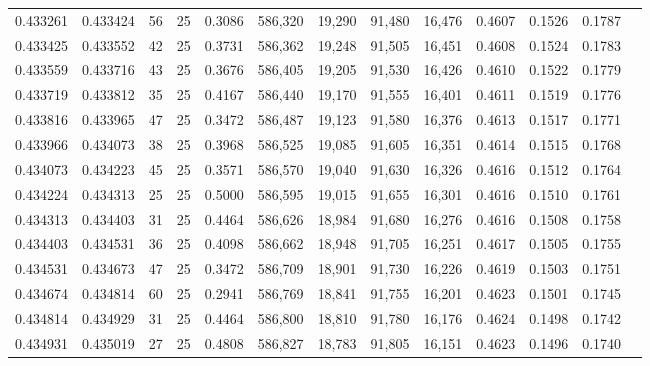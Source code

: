 \begin{tabular}{rrrrrrrrrrrrr}
0.433261 & 0.433424 &    56 &  25 &                                     0.3086 & 586,320 &  19,290 &  91,480 &  16,476 & 0.4607 & 0.1526 & 0.1787 \\
0.433425 & 0.433552 &    42 &  25 &                                     0.3731 & 586,362 &  19,248 &  91,505 &  16,451 & 0.4608 & 0.1524 & 0.1783 \\
0.433559 & 0.433716 &    43 &  25 &                                     0.3676 & 586,405 &  19,205 &  91,530 &  16,426 & 0.4610 & 0.1522 & 0.1779 \\
0.433719 & 0.433812 &    35 &  25 &                                     0.4167 & 586,440 &  19,170 &  91,555 &  16,401 & 0.4611 & 0.1519 & 0.1776 \\
0.433816 & 0.433965 &    47 &  25 &                                     0.3472 & 586,487 &  19,123 &  91,580 &  16,376 & 0.4613 & 0.1517 & 0.1771 \\
0.433966 & 0.434073 &    38 &  25 &                                     0.3968 & 586,525 &  19,085 &  91,605 &  16,351 & 0.4614 & 0.1515 & 0.1768 \\
0.434073 & 0.434223 &    45 &  25 &                                     0.3571 & 586,570 &  19,040 &  91,630 &  16,326 & 0.4616 & 0.1512 & 0.1764 \\
0.434224 & 0.434313 &    25 &  25 &                                     0.5000 & 586,595 &  19,015 &  91,655 &  16,301 & 0.4616 & 0.1510 & 0.1761 \\
0.434313 & 0.434403 &    31 &  25 &                                     0.4464 & 586,626 &  18,984 &  91,680 &  16,276 & 0.4616 & 0.1508 & 0.1758 \\
0.434403 & 0.434531 &    36 &  25 &                                     0.4098 & 586,662 &  18,948 &  91,705 &  16,251 & 0.4617 & 0.1505 & 0.1755 \\
0.434531 & 0.434673 &    47 &  25 &                                     0.3472 & 586,709 &  18,901 &  91,730 &  16,226 & 0.4619 & 0.1503 & 0.1751 \\
0.434674 & 0.434814 &    60 &  25 &                                     0.2941 & 586,769 &  18,841 &  91,755 &  16,201 & 0.4623 & 0.1501 & 0.1745 \\
0.434814 & 0.434929 &    31 &  25 &                                     0.4464 & 586,800 &  18,810 &  91,780 &  16,176 & 0.4624 & 0.1498 & 0.1742 \\
0.434931 & 0.435019 &    27 &  25 &                                     0.4808 & 586,827 &  18,783 &  91,805 &  16,151 & 0.4623 & 0.1496 & 0.1740 \\

\end{tabular}
